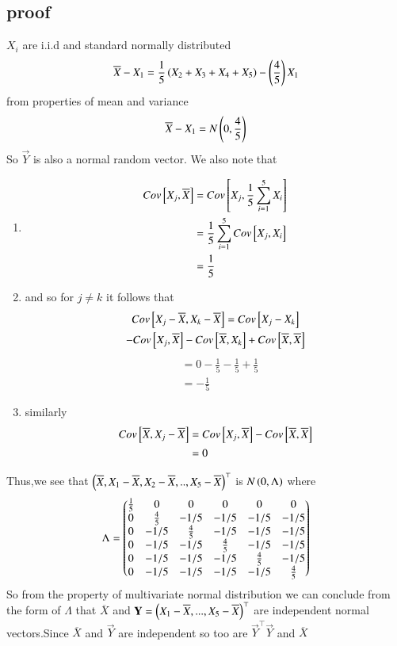 \documentclass[journal,12pt,twocolumn]{IEEEtran}
\begin{document}
\subsection{proof}
$X_i$ are i.i.d and standard normally distributed
\begin{multline}
    \overline{X}-X_1=\frac{1}{5}\left(X_2+X_3+X_4+X_5\right)
    -\left(\frac{4}{5}\right)X_1
\end{multline}
from properties of mean and variance
\begin{align}
  \overline{X}-X_1  =N\left(0,\frac{4}{5}\right)
\end{align}
So $\vec{Y}$ is also a normal random vector.
We also note that
\begin{enumerate}
    \item
    \begin{align}
        Cov{}\left[X_j,\overline{X}\right]&=Cov{}\left[X_j,\frac{1}{5}\sum_{i=1}^5 X_i\right]\\
       &= \frac{1}{5}\sum_{i=1}^5 Cov{}\left[X_j,X_i\right]\\
       &=\frac{1}{5}
    \end{align}
    \item and so for $j\neq k$ it follows that
    \begin{multline}
        Cov{}\left[X_j-\overline{X},X_k-\overline{X}\right]=Cov{}\left[X_j-X_k\right]\\-Cov{}\left[X_j,\overline{X}\right]-Cov{}\left[\overline{X},X_k\right]+Cov{}\left[\overline{X},\overline{X}\right]
    \end{multline}
    \begin{align}
        &=0-\frac{1}{5}-\frac{1}{5}+\frac{1}{5}\\
        &=-\frac{1}{5}
    \end{align}
    \item similarly
    \begin{align}
        Cov{}\left[\overline{X},X_j-\overline{X}\right]&=Cov{}\left[X_j,\overline{X}\right]-Cov{}\left[\overline{X},\overline{X}\right]\\
        &=0
    \end{align}
\end{enumerate}
Thus,we see that $\left(\overline{X},X_1-\overline{X},X_2-\overline{X},..,X_5-\overline{X}\right)^{\top}$ is $N\left(0,\Lambda\right)$ where
\begin{align}
    \Lambda=\begin{pmatrix}\frac{1}{5}&0&0&0&0&0\\
         0&\frac{4}{5}&-1/5&-1/5&-1/5&-1/5\\
         0&-1/5&\frac{4}{5}&-1/5&-1/5&-1/5\\
         0&-1/5&-1/5&\frac{4}{5}&-1/5&-1/5\\
         0&-1/5&-1/5&-1/5&\frac{4}{5}&-1/5\\
         0&-1/5&-1/5&-1/5&-1/5&\frac{4}{5}\\\end{pmatrix}
\end{align}
So from the property of multivariate normal distribution we can conclude from the form of $\Lambda$ that $\overline{X}$ and $\mathbf{Y}=\left(X_1-\overline{X},...,X_5-\overline{X}\right)^{\top}$ are independent normal vectors.Since $\overline{X}$ and $\vec{Y}$ are independent so too are $\vec{Y}^{\top}\vec{Y}$ and $\overline{X}$
\end{document}
